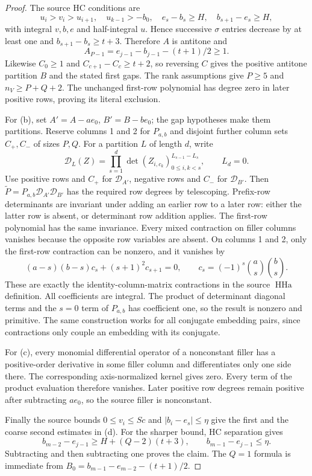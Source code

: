 \documentclass[11pt,a4paper]{article}
\theoremstyle{definition}\newtheorem{remark}[theorem]{Remark}
\begin{document}
\begin{proof}
The source HC conditions are
\[
 u_i>v_i>u_{i+1},\quad u_{k-1}>-b_0,\quad
 e_s-b_s\ge H,\quad b_{s+1}-e_s\ge H,
\]
with integral $v,b,e$ and half-integral $u$.
Hence successive $\sigma$ entries decrease by at least one and
$b_{s+1}-b_s\ge t+3$. Therefore $A$ is antitone and
\[
 A_{P-1}=e_{j-1}-b_{j-1}-(t+1)/2\ge1.
\]
Likewise $C_0\ge1$ and $C_{c+1}-C_c\ge t+2$, so reversing $C$
gives the positive antitone partition $B$ and the stated first gaps.
The rank assumptions give $P\ge5$ and $n_V\ge P+Q+2$.
The unchanged first-row polynomial has degree zero in later positive
rows, proving its literal exclusion.

For (b), set $A'=A-ae_0$, $B'=B-be_0$; the gap hypotheses make them
partitions. Reserve columns 1 and 2 for $P_{a,b}$ and disjoint further
column sets $C_+,C_-$ of sizes $P,Q$. For a partition $L$ of length $d$,
write
\[
 \mathcal D_L(Z)=\prod_{s=1}^{d}
 \det(Z_{i,c_k})_{0\le i,k<s}^{L_{s-1}-L_s},\qquad L_d=0.
\]
Use positive rows and $C_+$ for $\mathcal D_{A'}$, negative rows and
$C_-$ for $\mathcal D_{B'}$. Then
$\widetilde P=P_{a,b}\mathcal D_{A'}\mathcal D_{B'}$ has the required
row degrees by telescoping. Prefix-row determinants are invariant under
adding an earlier row to a later row: either the latter row is absent,
or determinant row addition applies. The first-row polynomial has the
same invariance. Every mixed contraction on filler columns vanishes
because the opposite row variables are absent. On columns 1 and 2,
only the first-row contraction can be nonzero, and it vanishes by
\[
 (a-s)(b-s)c_s+(s+1)^2c_{s+1}=0,
 \qquad c_s=(-1)^s\binom as\binom bs.
\]
These are exactly the identity-column-matrix contractions in the source
$\operatorname{HHa}$ definition. All coefficients are integral. The
product of determinant diagonal terms and the $s=0$ term of $P_{a,b}$
has coefficient one, so the result is nonzero and primitive. The same
construction works for all conjugate embedding pairs, since contractions
only couple an embedding with its conjugate.

For (c), every monomial differential operator of a nonconstant filler
has a positive-order derivative in some filler column and differentiates
only one side there. The corresponding axis-normalized kernel gives zero.
Every term of the product evaluation therefore vanishes. Later positive
row degrees remain positive after subtracting $ae_0$, so the source
filler is nonconstant.

Finally the source bounds $0\le v_i\le Sc$ and
$|b_i-e_s|\le\eta$ give the first and the coarse second estimates in (d).
For the sharper bound, HC separation gives
\[
 b_{m-2}-e_{j-1}\ge H+(Q-2)(t+3),
 \qquad b_{m-1}-e_{j-1}\le\eta.
\]
Subtracting and then subtracting one proves the claim. The $Q=1$ formula
is immediate from $B_0=b_{m-1}-e_{m-2}-(t+1)/2$.
\end{proof}
\end{document}
